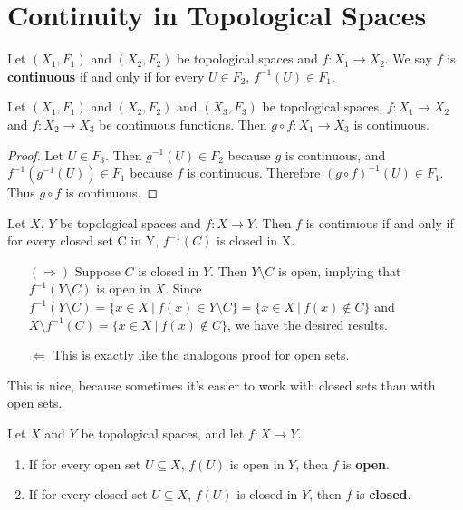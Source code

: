 \section{Continuity in Topological Spaces}

\begin{definition}
Let $(X_1,F_1)$ and $(X_2,F_2)$ be topological spaces and $f: X_1 \to X_2$. We say $f$ is {\bf continuous} if and only if for every $U \in F_2$, $f^{-1}(U)\in F_1$.
\end{definition}

\begin{smallfact}
 Let $(X_1,F_1)$ and $(X_2,F_2)$ and $(X_3,F_3)$ be topological spaces, $f: X_1 \to X_2$ and $f: X_2 \to X_3$ be continuous functions. Then $g \circ f: X_1 \to X_3$ is continuous.
 \end{smallfact}
\begin{proof}
Let $U \in F_3$.  Then $g^{-1}(U) \in F_2$ because $g$ is continuous, and $f^{-1}(g^{-1}(U)) \in F_1$ because $f$ is continuous. Therefore $(g \circ f)^{-1}(U) \in F_1$. Thus $g\circ f$ is continuous.
\end{proof}

\begin{theorem}
Let $X$, $Y$ be topological spaces and $f: X \to Y$. Then $f$ is continuous if and only if for every closed set C in Y, $f^{-1}(C)$ is closed in X.
\end{theorem}

\begin{itemize}
\item [$(\Rightarrow)$] Suppose $C$ is closed in $Y$. Then $Y\setminus C$ is open, implying that $f^{-1}(Y\setminus C)$ is open in $X$. Since $f^{-1}(Y\setminus C)= \{ x \in X\ |\ f(x) \in Y\setminus C\} = \{ x \in X\ |\ f(x) \notin C \}$ and $X\setminus f^{-1}(C)= \{ x \in X\ |\ f(x) \notin C \}$, we have the desired results.
\item [$\Leftarrow$] This is exactly like the analogous proof for open sets.
\end{itemize}

This is nice, because sometimes it's easier to work with closed sets than with open sets.

\begin{definition}
Let $X$ and $Y$ be topological spaces, and let $f:X\to Y$.  
\begin{enumerate}
\item If for every open set $U\subseteq X$, $f(U)$ is open in $Y$, then $f$ is {\bf open}.
\item If for every closed set $U\subseteq X$, $f(U)$ is closed in $Y$, then $f$ is {\bf closed}.
\end{enumerate}
\end{definition}


